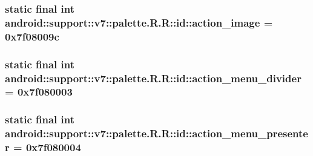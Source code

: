 \hypertarget{classandroid_1_1support_1_1v7_1_1palette_1_1_r_1_1id_557e34e043e907671c8a9f680b665463}{
\subsubsection[{action\_\-image}]{\setlength{\rightskip}{0pt plus 5cm}static final int android::support::v7::palette.R.R::id::action\_\-image = 0x7f08009c}}
\label{classandroid_1_1support_1_1v7_1_1palette_1_1_r_1_1id_557e34e043e907671c8a9f680b665463}


\hypertarget{classandroid_1_1support_1_1v7_1_1palette_1_1_r_1_1id_89153615c0aaae37e68bc07410ee9348}{
\subsubsection[{action\_\-menu\_\-divider}]{\setlength{\rightskip}{0pt plus 5cm}static final int android::support::v7::palette.R.R::id::action\_\-menu\_\-divider = 0x7f080003}}
\label{classandroid_1_1support_1_1v7_1_1palette_1_1_r_1_1id_89153615c0aaae37e68bc07410ee9348}


\hypertarget{classandroid_1_1support_1_1v7_1_1palette_1_1_r_1_1id_27a00b60badae349d271a64a24a46382}{
\subsubsection[{action\_\-menu\_\-presenter}]{\setlength{\rightskip}{0pt plus 5cm}static final int android::support::v7::palette.R.R::id::action\_\-menu\_\-presenter = 0x7f080004}}
\label{classandroid_1_1support_1_1v7_1_1palette_1_1_r_1_1id_27a00b60badae349d271a64a24a46382}


